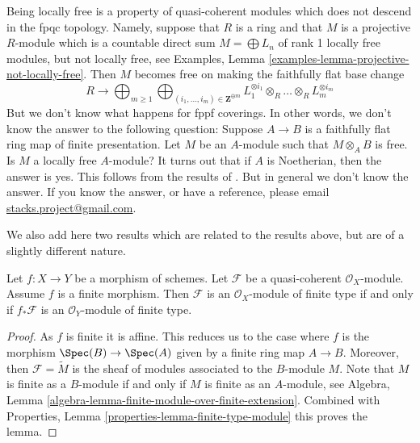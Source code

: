 \begin{remark}
\label{remark-locally-free-descends}
Being locally free is a property of quasi-coherent modules which
does not descend in the fpqc topology. Namely, suppose that
$R$ is a ring and that $M$ is a projective $R$-module which is
a countable direct sum $M = \bigoplus L_n$ of rank 1 locally
free modules, but not locally free, see
Examples, Lemma \ref{examples-lemma-projective-not-locally-free}.
Then $M$ becomes free on making the faithfully flat base change
$$
R \longrightarrow
\bigoplus\nolimits_{m \geq 1}
\bigoplus\nolimits_{(i_1, \ldots, i_m) \in \mathbf{Z}^{\oplus m}}
L_1^{\otimes i_1} \otimes_R \ldots \otimes_R L_m^{\otimes i_m}
$$
But we don't know what happens for fppf coverings. In other words,
we don't know the answer to the following question:
Suppose $A \to B$ is a faithfully
flat ring map of finite presentation. Let $M$ be an $A$-module
such that $M \otimes_A B$ is free. Is $M$ a locally free
$A$-module? It turns out that if $A$ is Noetherian, then the answer
is yes. This follows from the results of \cite{Bass}. But in general
we don't know the answer. If you know the answer, or have a reference,
please email
\href{mailto:stacks.project@gmail.com}{stacks.project@gmail.com}.
\end{remark}

\noindent
We also add here two results which are related to the results above, but
are of a slightly different nature.

\begin{lemma}
\label{lemma-finite-over-finite-module}
Let $f : X \to Y$ be a morphism of schemes.
Let $\mathcal{F}$ be a quasi-coherent $\mathcal{O}_X$-module.
Assume $f$ is a finite morphism.
Then $\mathcal{F}$ is an $\mathcal{O}_X$-module of finite type
if and only if $f_*\mathcal{F}$ is an $\mathcal{O}_Y$-module of finite
type.
\end{lemma}

\begin{proof}
As $f$ is finite it is affine. This reduces us to the case where
$f$ is the morphism $\Spec(B) \to \Spec(A)$ given
by a finite ring map $A \to B$.
Moreover, then $\mathcal{F} = \widetilde{M}$ is the sheaf of modules
associated to the $B$-module $M$.
Note that $M$ is finite as a $B$-module if and only if
$M$ is finite as an $A$-module, see
Algebra, Lemma \ref{algebra-lemma-finite-module-over-finite-extension}.
Combined with
Properties, Lemma \ref{properties-lemma-finite-type-module}
this proves the lemma.
\end{proof}

